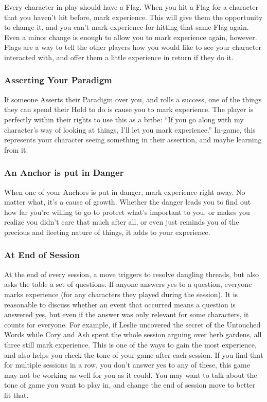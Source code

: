 \documentclass[
]{article}
\begin{document}
Every character in play should have a Flag. When you hit a Flag for a
character that you haven't hit before, mark experience. This will give
them the opportunity to change it, and you can't mark experience for
hitting that same Flag again. Even a minor change is enough to allow you
to mark experience again, however. Flags are a way to tell the other
players how you would like to see your character interacted with, and
offer them a little experience in return if they do it.

\hypertarget{asserting-your-paradigm}{%
\subsubsection{Asserting Your Paradigm}\label{asserting-your-paradigm}}

If someone Asserts their Paradigm over you, and rolls a success, one of
the things they can spend their Hold to do is cause you to mark
experience. The player is perfectly within their rights to use this as a
bribe: ``If you go along with my character's way of looking at things,
I'll let you mark experience.'' In-game, this represents your character
seeing something in their assertion, and maybe learning from it.

\hypertarget{an-anchor-is-put-in-danger}{%
\subsubsection{An Anchor is put in
Danger}\label{an-anchor-is-put-in-danger}}

When one of your Anchors is put in danger, mark experience right away.
No matter what, it's a cause of growth. Whether the danger leads you to
find out how far you're willing to go to protect what's important to
you, or makes you realize you didn't care that much after all, or even
just reminds you of the precious and fleeting nature of things, it adds
to your experience.

\hypertarget{at-end-of-session}{%
\subsubsection{At End of Session}\label{at-end-of-session}}

At the end of every session, a move triggers to resolve dangling
threads, but also asks the table a set of questions. If anyone answers
yes to a question, everyone marks experience (for any characters they
played during the session). It is reasonable to discuss whether an event
that occurred means a question is answered yes, but even if the answer
was only relevant for some characters, it counts for everyone. For
example, if Leslie uncovered the secret of the Untouched Words while
Cory and Ash spent the whole session arguing over herb gardens, all
three still mark experience. This is one of the ways to gain the most
experience, and also helps you check the tone of your game after each
session. If you find that for multiple sessions in a row, you don't
answer yes to any of these, this game may not be working as well for you
as it could. You may want to talk about the tone of game you want to
play in, and change the end of session move to better fit that.
\end{document}

